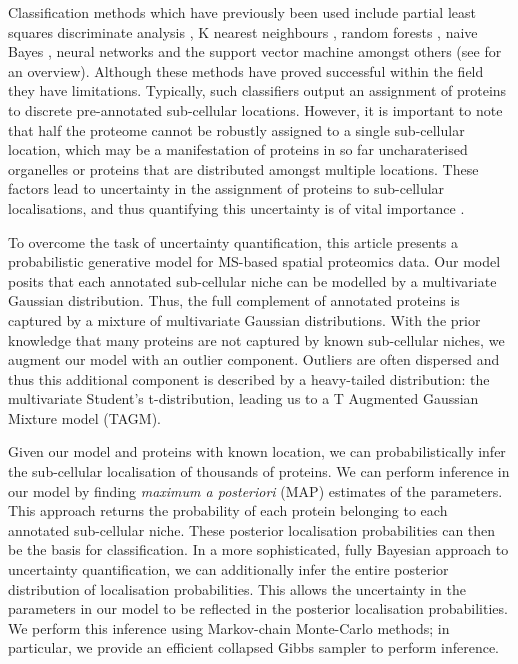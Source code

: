 \documentclass[12pt,english]{article}\usepackage[]{graphicx}\usepackage[]{color}
\begin{document}
Classification methods which have previously been used include partial
least squares discriminate analysis \citep{Dunkley:2006}, K nearest
neighbours \citep{Groen::2014}, random forests \citep{Ohta::2010},
naive Bayes \citep{Nikolovski::2012}, neural networks
\citep{Tardif::2012} and the support vector machine amongst others
(see \cite{Gatto:2014b} for an overview). Although these methods have
proved successful within the field they have limitations. Typically,
such classifiers output an assignment of proteins to discrete
pre-annotated sub-cellular locations. However, it is important to note
that half the proteome cannot be robustly assigned to a single
sub-cellular location, which may be a manifestation of proteins in so
far uncharaterised organelles or proteins that are distributed amongst
multiple locations. These factors lead to uncertainty in the
assignment of proteins to sub-cellular localisations, and thus
quantifying this uncertainty is of vital importance \citep{Kirk:2015}.

To overcome the task of uncertainty quantification, this article
presents a probabilistic generative model for MS-based spatial
proteomics data. Our model posits that each annotated sub-cellular
niche can be modelled by a multivariate Gaussian distribution. Thus,
the full complement of annotated proteins is captured by a mixture of
multivariate Gaussian distributions. With the prior knowledge that
many proteins are not captured by known sub-cellular niches, we
augment our model with an outlier component. Outliers are often
dispersed and thus this additional component is described by a
heavy-tailed distribution: the multivariate Student's t-distribution,
leading us to a T Augmented Gaussian Mixture model (TAGM).

Given our model and proteins with known location, we can
probabilistically infer the sub-cellular localisation of thousands of
proteins. We can perform inference in our model by finding
\textit{maximum a posteriori} (MAP) estimates of the parameters. This
approach returns the probability of each protein belonging to each
annotated sub-cellular niche. These posterior localisation
probabilities can then be the basis for classification. In a more
sophisticated, fully Bayesian approach to uncertainty quantification,
we can additionally infer the entire posterior distribution of
localisation probabilities. This allows the uncertainty in the
parameters in our model to be reflected in the posterior localisation
probabilities. We perform this inference using Markov-chain
Monte-Carlo methods; in particular, we provide an efficient collapsed
Gibbs sampler to perform inference.
\end{document}

